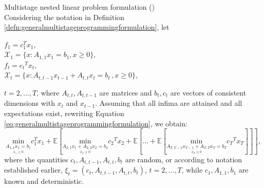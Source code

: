 \begin{defn}{\normalfont Multistage nested linear problem formulation} \label{defn:nestedlinearmultistageprogrammingformulation}
{\normalfont (\cite[Ch. 1, p. 25]{stochasticprogrammingbible})}
 \\
Considering the notation in Definition \ref{defn:generalmultistageprogrammingformulation}, let 
\begin{center}
$f_1=c_1^Tx_1$, \\ $\mathcal{X}_1=\{x:A_{1,1}x_1=b_1, x \geq 0 \}$, \\ $f_t = {c_t}^T x_t$, \\ $\mathcal{X}_t=\{x:A_{t,t-1}x_{t-1}+A_{t,t}x_t=b_t\, , x \geq 0\}$,  \\  
\end{center}
$t=2,\dots,T$, where $A_{t,t}, A_{t,t-1}$ are matrices and $b_t, c_t$ are vectors of consistent dimensions with $x_t$ and $x_{t-1}$.  Assuming that all infima are attained and all expectations exist, rewriting Equation \ref{eq:generalmultistageprogrammingformulation}, we obtain:
\scriptsize
\begin{equation}
\label{eq:nestedlinearmultistageprogrammingformulation}
\underset{\underset{x_1 \geq 0}{A_{1,1}x_1=b_1}}{\mathrm{min}}
 c_1^Tx_1 + \mathbb{E}\left[ \underset{\underset{x_{2} \geq 0}{A_{2,1}x_{1}+A_{2,2}x_2=b_2}}{\mathrm{min}} {c_2}^Tx_2 + \mathbb{E}\left[\dots + \mathbb{E}\left[ \underset{\underset{x_{T} \geq 0}{A_{T,T-1}x_{T-1}+A_{T,T}x_T=b_T}}{\mathrm{min}} {c_T}^Tx_T \right] \right] \right],
\end{equation}
\normalsize
where the quantities $c_t, A_{t,t-1}, A_{t,t}, b_{t}$ are random, or according to notation established earlier, $\xi_t=(c_t, A_{t,t-1}, A_{t,t}, b_{t})$, $t=2,\dots,T$, while $c_1, A_{1,1}, b_{1}$ are known and deterministic.
\end{defn}

